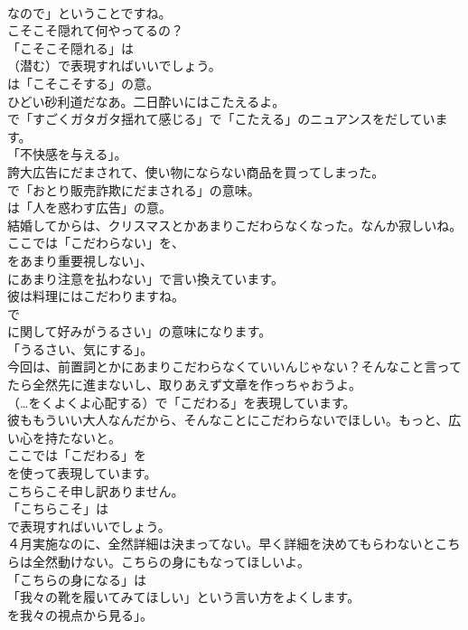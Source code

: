 \documentclass[8pt]{extreport}
\begin{document}
\begin{CJK}{UTF8}{min}
\\	なので」ということですね。	
\\	こそこそ隠れて何やってるの？ 
\\	「こそこそ隠れる」は
\\	（潜む）で表現すればいいでしょう。
\\	は「こそこそする」の意。	
\\	ひどい砂利道だなあ。二日酔いにはこたえるよ。 
\\	で「すごくガタガタ揺れて感じる」で「こたえる」のニュアンスをだしています。
\\	「不快感を与える」。	
\\	誇大広告にだまされて、使い物にならない商品を買ってしまった。 
\\	で「おとり販売詐欺にだまされる」の意味。
\\	は「人を惑わす広告」の意。	
\\	結婚してからは、クリスマスとかあまりこだわらなくなった。なんか寂しいね。 
\\	ここでは「こだわらない」を、
\\	をあまり重要視しない」、
\\	にあまり注意を払わない」で言い換えています。	
\\	彼は料理にはこだわりますね。 
\\	で
\\	に関して好みがうるさい」の意味になります。
\\	「うるさい、気にする」。	
\\	今回は、前置詞とかにあまりこだわらなくていいんじゃない？そんなこと言ってたら全然先に進まないし、取りあえず文章を作っちゃおうよ。 
\\	（…をくよくよ心配する）で「こだわる」を表現しています。	
\\	彼ももういい大人なんだから、そんなことにこだわらないでほしい。もっと、広い心を持たないと。 
\\	ここでは「こだわる」を 
\\	を使って表現しています。	
\\	こちらこそ申し訳ありません。 
\\	「こちらこそ」は 
\\	で表現すればいいでしょう。	
\\	４月実施なのに、全然詳細は決まってない。早く詳細を決めてもらわないとこちらは全然動けない。こちらの身にもなってほしいよ。 
\\	「こちらの身になる」は
\\	「我々の靴を履いてみてほしい」という言い方をよくします。
\\	を我々の視点から見る」。	

\end{CJK}
\end{document}
